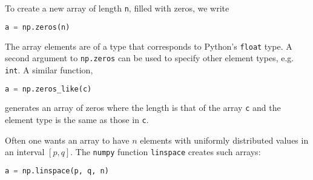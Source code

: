 \documentclass[graybox,sectrefs,envcountresetchap,open=right,final]{svmonodo}
\begin{document}
To create a new array of length \texttt{n}, filled with zeros, we write



\begin{lstlisting}[language=python,style=simple,xleftmargin=2mm]
a = np.zeros(n)

\end{lstlisting}

The array elements are of a type that corresponds to Python's
\texttt{float} type. A second argument to \texttt{np.zeros} can be used to
specify other element types, e.g. \texttt{int}.
A similar function,



\begin{lstlisting}[language=python,style=simple,xleftmargin=2mm]
a = np.zeros_like(c)

\end{lstlisting}

generates an array of zeros where the length is that of the array \texttt{c}
and the element type is the same as those in \texttt{c}.


Often one wants an array to have $n$ elements with uniformly
distributed values in an interval $[p,q]$. The \texttt{numpy} function
\texttt{linspace} creates such arrays:



\begin{lstlisting}[language=python,style=simple,xleftmargin=2mm]
a = np.linspace(p, q, n)

\end{lstlisting}
\end{document}
